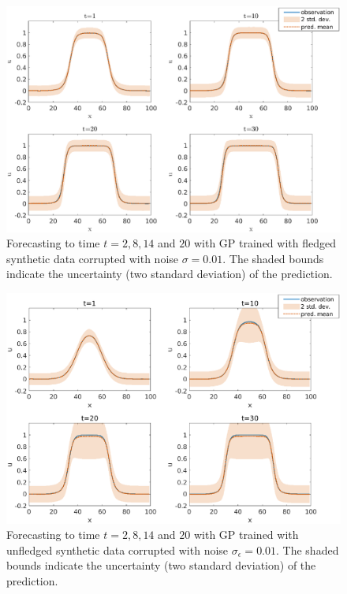 \documentclass[11pt, reqno]{amsart}
\begin{document}
\begin{figure}[ht]
\centerline{\includegraphics[width=\textwidth]{chapterGP/figures/bistable}}
\caption{\label{fig:u subplot ic1} Forecasting to time $t=2,8,14$ and $20$ with GP trained with fledged synthetic data corrupted with noise $\sigma=0.01$. The shaded bounds indicate the uncertainty (two standard deviation) of the prediction.} 
\end{figure}

\begin{figure}[h]
\centerline{\includegraphics[width=\textwidth]{chapterGP/figures/bistable-short}}
\caption[Forecasting to Time $t=2,8,14$ and $20$ with GP Trained with Unfledged Synthetic Data]{\label{fig:u subplot ic2} Forecasting to time $t=2,8,14$ and $20$ with GP trained with unfledged synthetic data corrupted with noise $\sigma_{\epsilon}=0.01$. The shaded bounds indicate the uncertainty (two standard deviation) of the prediction.}
\end{figure}
\end{document}
